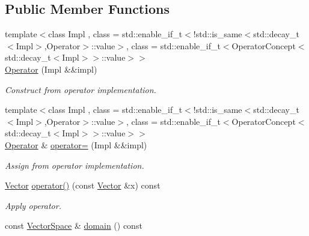 \subsection*{Public Member Functions}
\begin{DoxyCompactItemize}
\item 
\hypertarget{classSpacy_1_1Operator_a2b2cdfbd76e33693de336981f66b0ece}{}{\footnotesize template$<$class Impl , class  = std\+::enable\+\_\+if\+\_\+t$<$!std\+::is\+\_\+same$<$std\+::decay\+\_\+t$<$\+Impl$>$,\+Operator$>$\+::value$>$, class  = std\+::enable\+\_\+if\+\_\+t$<$\+Operator\+Concept$<$std\+::decay\+\_\+t$<$\+Impl$>$$>$\+::value$>$$>$ }\\\hyperlink{classSpacy_1_1Operator_a2b2cdfbd76e33693de336981f66b0ece}{Operator} (Impl \&\&impl)\label{classSpacy_1_1Operator_a2b2cdfbd76e33693de336981f66b0ece}

\begin{DoxyCompactList}\small\item\em Construct from operator implementation. \end{DoxyCompactList}\item 
\hypertarget{classSpacy_1_1Operator_a52b59211b138394330c7cba3f52ab791}{}{\footnotesize template$<$class Impl , class  = std\+::enable\+\_\+if\+\_\+t$<$!std\+::is\+\_\+same$<$std\+::decay\+\_\+t$<$\+Impl$>$,\+Operator$>$\+::value$>$, class  = std\+::enable\+\_\+if\+\_\+t$<$\+Operator\+Concept$<$std\+::decay\+\_\+t$<$\+Impl$>$$>$\+::value$>$$>$ }\\\hyperlink{classSpacy_1_1Operator}{Operator} \& \hyperlink{classSpacy_1_1Operator_a52b59211b138394330c7cba3f52ab791}{operator=} (Impl \&\&impl)\label{classSpacy_1_1Operator_a52b59211b138394330c7cba3f52ab791}

\begin{DoxyCompactList}\small\item\em Assign from operator implementation. \end{DoxyCompactList}\item 
\hypertarget{classSpacy_1_1Operator_a2ab6072d6f9d98e0d5590531c080e3ad}{}\hyperlink{classSpacy_1_1Vector}{Vector} \hyperlink{classSpacy_1_1Operator_a2ab6072d6f9d98e0d5590531c080e3ad}{operator()} (const \hyperlink{classSpacy_1_1Vector}{Vector} \&x) const \label{classSpacy_1_1Operator_a2ab6072d6f9d98e0d5590531c080e3ad}

\begin{DoxyCompactList}\small\item\em Apply operator. \end{DoxyCompactList}\item 
\hypertarget{classSpacy_1_1Operator_a3b3d457bee48adf00d683a6aec4aa841}{}const \hyperlink{classSpacy_1_1VectorSpace}{Vector\+Space} \& \hyperlink{classSpacy_1_1Operator_a3b3d457bee48adf00d683a6aec4aa841}{domain} () const \label{classSpacy_1_1Operator_a3b3d457bee48adf00d683a6aec4aa841}


\end{DoxyCompactItemize}
